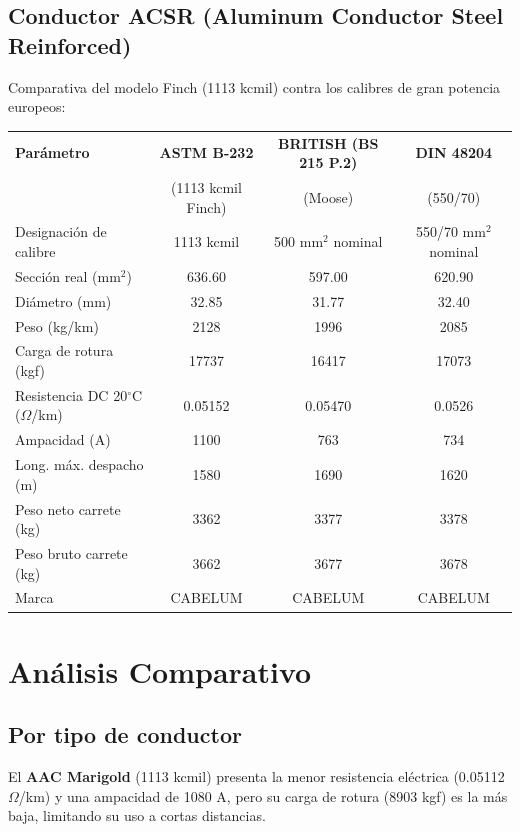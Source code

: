 \documentclass[12pt,a4paper]{article}
\begin{document}
\begin{landscape}
\subsection{Conductor ACSR (Aluminum Conductor Steel Reinforced)}

Comparativa del modelo Finch (1113 kcmil) contra los calibres de gran
potencia europeos:

\begin{center}
\begin{tabular}{p{4cm}c|c|c}
\toprule
\textbf{Parámetro} & \textbf{ASTM B-232} & \textbf{BRITISH (BS 215 P.2)} & \textbf{DIN 48204} \\
& (1113 kcmil Finch) & (Moose) & (550/70) \\
\midrule
Designación de calibre & 1113 kcmil & 500 mm$^2$ nominal & 550/70 mm$^2$ nominal \\
\midrule
Sección real (mm$^2$) & 636.60 & 597.00 & 620.90 \\
\midrule
Diámetro (mm) & 32.85 & 31.77 & 32.40 \\
\midrule
Peso (kg/km) & 2128 & 1996 & 2085 \\
\midrule
Carga de rotura (kgf) & 17737 & 16417 & 17073 \\
\midrule
Resistencia DC 20$^\circ$C ($\Omega$/km) & 0.05152 & 0.05470 & 0.0526 \\
\midrule
Ampacidad (A) & 1100 & 763 & 734 \\
\midrule
Long. máx. despacho (m) & 1580 & 1690 & 1620 \\
\midrule
Peso neto carrete (kg) & 3362 & 3377 & 3378 \\
\midrule
Peso bruto carrete (kg) & 3662 & 3677 & 3678 \\
\midrule
Marca & CABELUM & CABELUM & CABELUM \\
\bottomrule
\end{tabular}
\end{center}
\end{landscape}

\section{Análisis Comparativo}

\subsection{Por tipo de conductor}

El \textbf{AAC Marigold} (1113 kcmil) presenta la menor resistencia eléctrica
(0.05112 $\Omega$/km) y una ampacidad de 1080 A, pero su carga de rotura
(8903 kgf) es la más baja, limitando su uso a cortas distancias.
\end{document}
